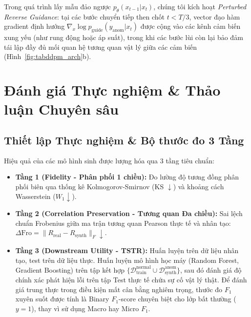 \documentclass{article}
\begin{document}
Trong quá trình lấy mẫu đảo ngược $p_\theta(x_{t-1}|x_t)$, chúng tôi kích hoạt \emph{Perturbed Reverse Guidance}: tại các bước chuyển tiếp then chốt $t < T/3$, vector đạo hàm gradient định hướng $\nabla_x \log p_{\text{guide}}(y_{\text{anom}}|x_t)$ được cộng vào các kênh cảm biến xung yếu (như rung động hoặc áp suất), trong khi các bước lùi còn lại bảo đảm tái lập đầy đủ mối quan hệ tương quan vật lý giữa các cảm biến (Hình~\ref{fig:tabddpm_arch}b).

\section{Đánh giá Thực nghiệm \& Thảo luận Chuyên sâu}
\label{sec:experiments}

\subsection{Thiết lập Thực nghiệm \& Bộ thước đo 3 Tầng}
Hiệu quả của các mô hình sinh được lượng hóa qua 3 tầng tiêu chuẩn:
\begin{itemize}
    \item \textbf{Tầng 1 (Fidelity - Phân phối 1 chiều):} Đo lường độ tương đồng phân phối biên qua thống kê Kolmogorov-Smirnov (KS $\downarrow$) và khoảng cách Wasserstein ($W_1 \downarrow$).
    \item \textbf{Tầng 2 (Correlation Preservation - Tương quan Đa chiều):} Sai lệch chuẩn Frobenius giữa ma trận tương quan Pearson thực tế và nhân tạo: $\Delta \text{Fro} = \| R_{\text{real}} - R_{\text{synth}} \|_F \downarrow$.
    \item \textbf{Tầng 3 (Downstream Utility - TSTR):} Huấn luyện trên dữ liệu nhân tạo, test trên dữ liệu thực. Huấn luyện mô hình học máy (Random Forest, Gradient Boosting) trên tập kết hợp $\{\mathcal{D}_{\text{train}}^{\text{normal}} \cup \mathcal{D}_{\text{synth}}^{\text{anom}}\}$, sau đó đánh giá độ chính xác phát hiện lỗi trên tập Test thực tế chứa sự cố vật lý thật. Để đánh giá trung thực trong điều kiện mất cân bằng nghiêm trọng, thước đo $F_1$ xuyên suốt được tính là Binary $F_1$-score chuyên biệt cho lớp bất thường ($y=1$), thay vì sử dụng Macro hay Micro $F_1$.
\end{itemize}
\end{document}
